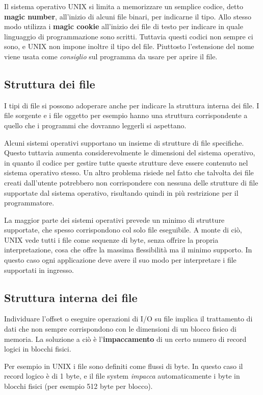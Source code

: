         Il sistema operativo UNIX si limita a memorizzare un semplice codice, detto \textbf{magic number}, all'inizio di alcuni file binari, per indicarne il tipo. Allo stesso modo utilizza i \textbf{magic cookie} all'inizio dei file di testo per indicare in quale linguaggio di programmazione sono scritti. Tuttavia questi codici non sempre ci sono, e UNIX non impone inoltre il tipo del file. Piuttosto l'estensione del nome viene usata come \textit{consiglio} sul programma da usare per aprire il file.
        
    \subsection{Struttura dei file}
        I tipi di file si possono adoperare anche per indicare la struttura interna dei file. I file sorgente e i file oggetto per esempio hanno una struttura corrispondente a quello che i programmi che dovranno leggerli si aspettano.
        
        Alcuni sistemi operativi supportano un insieme di strutture di file specifiche. Questo tuttavia aumenta considerevolmente le dimensioni del sistema operativo, in quanto il codice per gestire tutte queste strutture deve essere contenuto nel sistema operativo stesso. Un altro problema risiede nel fatto che talvolta dei file creati dall'utente potrebbero non corrispondere con nessuna delle strutture di file supportate dal sistema operativo, risultando quindi in più restrizione per il programmatore.
        
        La maggior parte dei sistemi operativi prevede un minimo di strutture supportate, che spesso corrispondono col solo file eseguibile. A monte di ciò, UNIX vede tutti i file come sequenze di byte, senza offrire la propria interpretazione, cosa che offre la massima flessibilità ma il minimo supporto. In questo caso ogni applicazione deve avere il suo modo per interpretare i file supportati in ingresso.
        
    \subsection{Struttura interna dei file}
        Individuare l'offset o eseguire operazioni di I/O su file implica il trattamento di dati che non sempre corrispondono con le dimensioni di un blocco fisico di memoria. La soluzione a ciò è l'\textbf{impaccamento} di un certo numero di record logici in blocchi fisici.
        
        Per esempio in UNIX i file sono definiti come flussi di byte. In questo caso il record logico è di 1 byte, e il file system \textit{impacca} automaticamente i byte in blocchi fisici (per esempio 512 byte per blocco).
        
